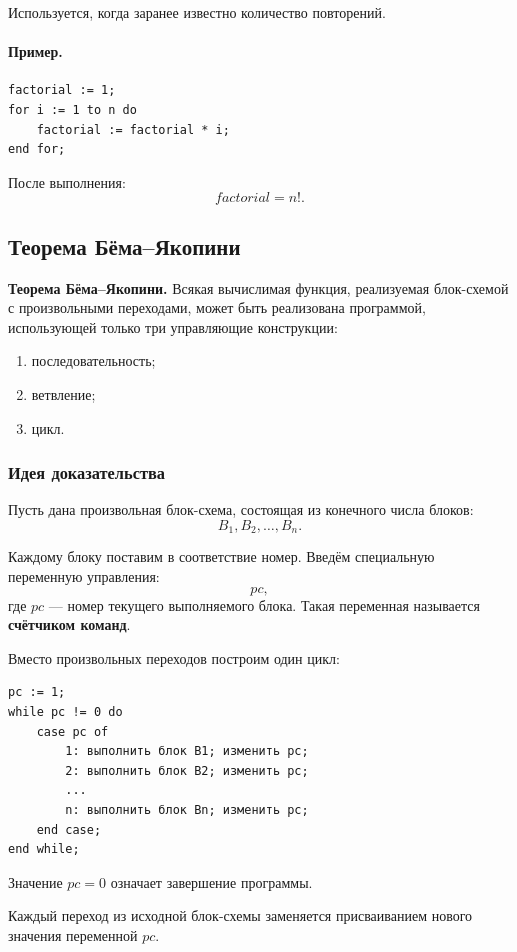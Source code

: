 \documentclass[12pt,a4paper]{article}
\begin{document}
Используется, когда заранее известно количество повторений.

\paragraph{Пример.}

\begin{verbatim}
factorial := 1;
for i := 1 to n do
    factorial := factorial * i;
end for;
\end{verbatim}

После выполнения:
\[
    factorial = n!.
\]

\subsection{Теорема Бёма--Якопини}

\textbf{Теорема Бёма--Якопини.}
Всякая вычислимая функция, реализуемая блок-схемой с произвольными переходами, может быть реализована программой, использующей только три управляющие конструкции:
\begin{enumerate}
    \item последовательность;
    \item ветвление;
    \item цикл.
\end{enumerate}

\subsubsection{Идея доказательства}

Пусть дана произвольная блок-схема, состоящая из конечного числа блоков:
\[
    B_1, B_2, \dots, B_n.
\]

Каждому блоку поставим в соответствие номер. Введём специальную переменную управления:
\[
    pc,
\]
где $pc$ --- номер текущего выполняемого блока. Такая переменная называется \textbf{счётчиком команд}.

Вместо произвольных переходов построим один цикл:

\begin{verbatim}
pc := 1;
while pc != 0 do
    case pc of
        1: выполнить блок B1; изменить pc;
        2: выполнить блок B2; изменить pc;
        ...
        n: выполнить блок Bn; изменить pc;
    end case;
end while;
\end{verbatim}

Значение $pc = 0$ означает завершение программы.

Каждый переход из исходной блок-схемы заменяется присваиванием нового значения переменной $pc$.
\end{document}
